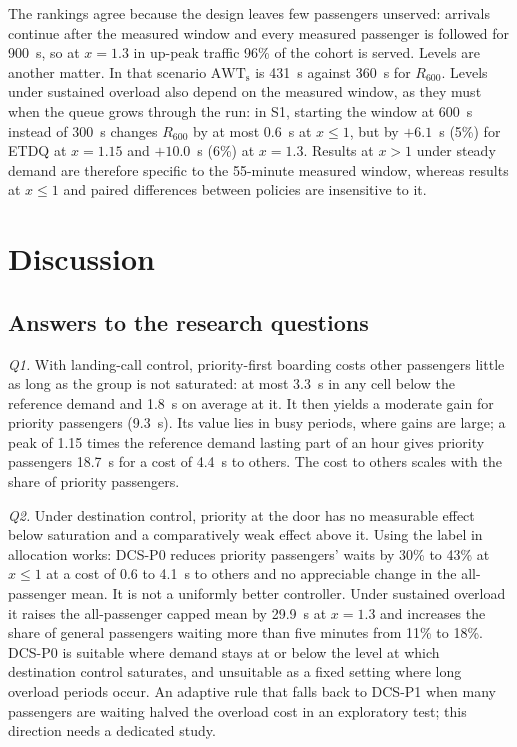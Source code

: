 \documentclass[12pt,a4paper]{article}
\begin{document}
The rankings agree because the design leaves few passengers unserved: arrivals continue after the measured window and every measured passenger is followed for 900~s, so at $x=1.3$ in up-peak traffic 96\% of the cohort is served. Levels are another matter. In that scenario $\mathrm{AWT}_{\mathrm{s}}$ is 431~s against 360~s for $R_{600}$. Levels under sustained overload also depend on the measured window, as they must when the queue grows through the run: in S1, starting the window at 600~s instead of 300~s changes $R_{600}$ by at most 0.6~s at $x\le1$, but by $+6.1$~s (5\%) for ETDQ at $x=1.15$ and $+10.0$~s (6\%) at $x=1.3$. Results at $x>1$ under steady demand are therefore specific to the 55-minute measured window, whereas results at $x\le1$ and paired differences between policies are insensitive to it.

\section{Discussion}\label{sec:discussion}

\subsection{Answers to the research questions}
\emph{Q1.} With landing-call control, priority-first boarding costs other passengers little as long as the group is not saturated: at most 3.3~s in any cell below the reference demand and 1.8~s on average at it. It then yields a moderate gain for priority passengers (9.3~s). Its value lies in busy periods, where gains are large; a peak of 1.15 times the reference demand lasting part of an hour gives priority passengers 18.7~s for a cost of 4.4~s to others. The cost to others scales with the share of priority passengers.

\emph{Q2.} Under destination control, priority at the door has no measurable effect below saturation and a comparatively weak effect above it. Using the label in allocation works: DCS-P0 reduces priority passengers' waits by 30\% to 43\% at $x\le1$ at a cost of 0.6 to 4.1~s to others and no appreciable change in the all-passenger mean. It is not a uniformly better controller. Under sustained overload it raises the all-passenger capped mean by 29.9~s at $x=1.3$ and increases the share of general passengers waiting more than five minutes from 11\% to 18\%. DCS-P0 is suitable where demand stays at or below the level at which destination control saturates, and unsuitable as a fixed setting where long overload periods occur. An adaptive rule that falls back to DCS-P1 when many passengers are waiting halved the overload cost in an exploratory test; this direction needs a dedicated study.
\end{document}
